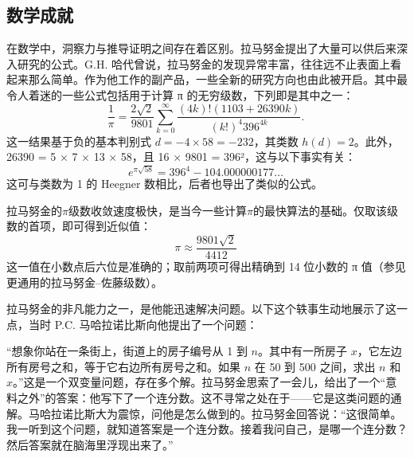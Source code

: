 \subsection{数学成就}
在数学中，洞察力与推导证明之间存在着区别。拉马努金提出了大量可以供后来深入研究的公式。G.H. 哈代曾说，拉马努金的发现异常丰富，往往远不止表面上看起来那么简单。作为他工作的副产品，一些全新的研究方向也由此被开启。其中最令人着迷的一些公式包括用于计算 π 的无穷级数，下列即是其中之一：
$$
\frac{1}{\pi} = \frac{2\sqrt{2}}{9801} \sum_{k=0}^{\infty} \frac{(4k)!(1103 + 26390k)}{(k!)^4 396^{4k}}.~
$$
这一结果基于负的基本判别式 $d = -4 \times 58 = -232$，其类数 $h(d) = 2$。此外，26390 = 5 × 7 × 13 × 58，且 16 × 9801 = 396²，这与以下事实有关：
$$
e^{\pi \sqrt{58}} = 396^4 - 104.000000177\ldots~
$$
这可与类数为 1 的 Heegner 数相比，后者也导出了类似的公式。

拉马努金的$\pi$级数收敛速度极快，是当今一些计算$\pi$的最快算法的基础。仅取该级数的首项，即可得到近似值：
$$
\pi \approx \frac{9801\sqrt{2}}{4412}~
$$
这一值在小数点后六位是准确的；取前两项可得出精确到 14 位小数的 π 值（参见更通用的拉马努金–佐藤级数）。

拉马努金的非凡能力之一，是他能迅速解决问题。以下这个轶事生动地展示了这一点，当时 P.C. 马哈拉诺比斯向他提出了一个问题：

“想象你站在一条街上，街道上的房子编号从 1 到 $n$。其中有一所房子 $x$，它左边所有房号之和，等于它右边所有房号之和。如果 $n$ 在 50 到 500 之间，求出 $n$ 和 $x$。”这是一个双变量问题，存在多个解。拉马努金思索了一会儿，给出了一个“意料之外”的答案：他写下了一个连分数。这不寻常之处在于——它是这类问题的通解。马哈拉诺比斯大为震惊，问他是怎么做到的。拉马努金回答说：“这很简单。我一听到这个问题，就知道答案是一个连分数。接着我问自己，是哪一个连分数？然后答案就在脑海里浮现出来了。”
